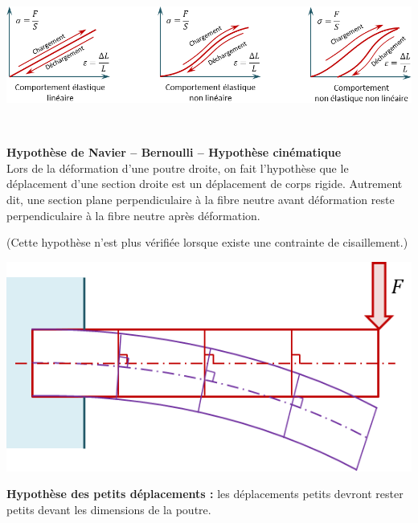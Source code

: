 \documentclass[10pt,fleqn]{article} %
\begin{document}
\begin{center}
\includegraphics[width=.8\linewidth]{images/ElastiqueLineaire}
\end{center}

\begin{hypo} ~\\

\noindent\begin{minipage}[c]{.65\linewidth}
\textbf{Hypothèse de Navier -- Bernoulli -- Hypothèse cinématique}\\
Lors de la déformation d'une poutre droite, on fait l'hypothèse que le déplacement d'une section droite est un déplacement de corps rigide. Autrement dit, une section plane perpendiculaire à la fibre neutre avant déformation reste perpendiculaire à la fibre neutre après déformation.

(Cette hypothèse n'est plus vérifiée lorsque existe une contrainte de cisaillement.)
\end{minipage} \hfill
\begin{minipage}[c]{.3\linewidth}
\begin{center}
\includegraphics[width=\linewidth]{images/navier}
\end{center}
\end{minipage}
\end{hypo}

\begin{hypo}
\textbf{Hypothèse des petits déplacements :} les déplacements petits devront rester petits devant les dimensions de la poutre. 
\end{hypo}
\end{document}
